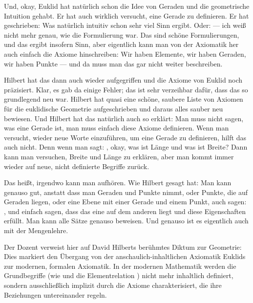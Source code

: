 \begin{spoken-clean}[00:08:20 - 00:10:05]
Und, okay, Euklid hat natürlich schon die Idee von Geraden und die geometrische Intuition gehabt. Er hat auch wirklich versucht, eine Gerade zu definieren. Er hat geschrieben:  Was natürlich intuitiv schon sehr viel Sinn ergibt. Oder:  --- ich weiß nicht mehr genau, wie die Formulierung war. Das sind schöne Formulierungen, und das ergibt insofern Sinn, aber eigentlich kann man von der Axiomatik her auch einfach die Axiome hinschreiben: Wir haben Elemente, wir haben Geraden, wir haben Punkte --- und da muss man das gar nicht weiter beschreiben.

Hilbert hat das dann auch wieder aufgegriffen und die Axiome von Euklid noch präzisiert. Klar, es gab da einige Fehler; das ist sehr verzeihbar dafür, dass das so grundlegend neu war. Hilbert hat quasi eine schöne, saubere Liste von Axiomen für die euklidische Geometrie aufgeschrieben und daraus alles sauber neu bewiesen. Und Hilbert hat das natürlich auch so erklärt: Man muss nicht sagen, was eine Gerade ist, man muss einfach diese Axiome definieren. Wenn man versucht, wieder neue Worte einzuführen, um eine Gerade zu definieren, hilft das auch nicht. Denn wenn man sagt: , okay, was ist Länge und was ist Breite? Dann kann man versuchen, Breite und Länge zu erklären, aber man kommt immer wieder auf neue, nicht definierte Begriffe zurück.

Das heißt, irgendwo kann man aufhören. Wie Hilbert gesagt hat: Man kann genauso gut, anstatt dass man Geraden und Punkte nimmt, oder Punkte, die auf Geraden liegen, oder eine Ebene mit einer Gerade und einem Punkt, auch sagen: , und einfach sagen, dass das eine auf dem anderen liegt und diese Eigenschaften erfüllt. Man kann alle Sätze genauso beweisen. Und genauso ist es eigentlich auch mit der Mengenlehre.
\end{spoken-clean}

\begin{didactic-insight}
Der Dozent verweist hier auf David Hilberts berühmtes Diktum zur Geometrie:  Dies markiert den Übergang von der anschaulich-inhaltlichen Axiomatik Euklids zur modernen, formalen Axiomatik. In der modernen Mathematik werden die Grundbegriffe (wie  und die Elementrelation \qt{$\in$}) nicht mehr inhaltlich definiert, sondern ausschließlich implizit durch die Axiome charakterisiert, die ihre Beziehungen untereinander regeln.
\end{didactic-insight}

